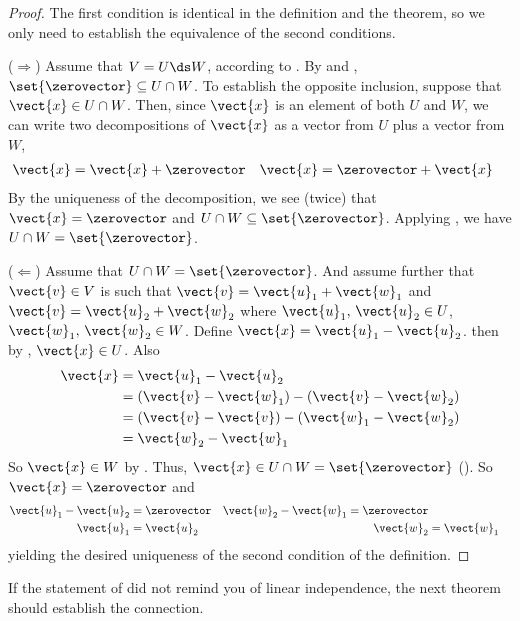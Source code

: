 %
\begin{proof}
The first condition is identical in the definition and the theorem, so we only need to establish the equivalence of the second conditions.\par
%
($\Rightarrow$)
Assume that $V=U\ds W$, according to .   By  and , $\set{\zerovector}\subseteq U\cap W$.  To establish the opposite inclusion, suppose that $\vect{x}\in U\cap W$.  Then, since $\vect{x}$ is an element of both $U$ and $W$, we can write two decompositions of $\vect{x}$ as a vector from $U$ plus a vector from $W$,
%
\begin{align*}
\vect{x}&=\vect{x}+\zerovector
&
\vect{x}&=\zerovector+\vect{x}
\end{align*}
%
By the uniqueness of the decomposition, we see (twice) that $\vect{x}=\zerovector$ and $U\cap W\subseteq\set{\zerovector}$.  Applying , we have $U\cap W=\set{\zerovector}$.\par
%
($\Leftarrow$)
Assume that $U\cap W=\set{\zerovector}$.  And assume further that $\vect{v}\in V$ is such that  $\vect{v}=\vect{u}_1+\vect{w}_1$ and $\vect{v}=\vect{u}_2+\vect{w}_2$ where $\vect{u}_1,\,\vect{u}_2\in U$, $\vect{w}_1,\,\vect{w}_2\in W$.  Define $\vect{x}=\vect{u}_1-\vect{u}_2$.  then by , $\vect{x}\in U$.  Also
%
\begin{align*}
\vect{x}
&=\vect{u}_1-\vect{u}_2\\
&=\left(\vect{v}-\vect{w}_1\right)-\left(\vect{v}-\vect{w}_2\right)\\
&=\left(\vect{v}-\vect{v}\right)-\left(\vect{w}_1-\vect{w}_2\right)\\
&=\vect{w}_2-\vect{w}_1
\end{align*}
%
So $\vect{x}\in W$ by .  Thus, $\vect{x}\in U\cap W =\set{\zerovector}$ ().  So $\vect{x}=\zerovector$ and
%
\begin{align*}
\vect{u}_1-\vect{u}_2&=\zerovector & \vect{w}_2-\vect{w}_1 = \zerovector\\
\vect{u}_1&=\vect{u}_2 & \vect{w}_2&=\vect{w}_1\\
\end{align*}
%
yielding the desired uniqueness of the second condition of the definition.
\end{proof}
%
If the statement of  did not remind you of linear independence, the next theorem should establish the connection.
%
